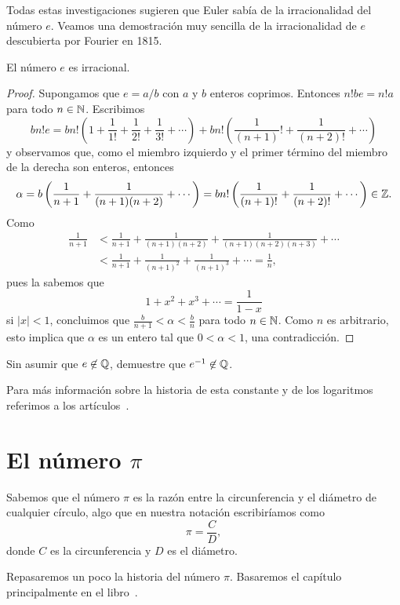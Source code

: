 Todas estas investigaciones sugieren que Euler sabía de la irracionalidad del
número $e$. Veamos una demostración muy sencilla de la irracionalidad de $e$
descubierta por Fourier en 1815. 

\begin{theorem}
	El número $e$ es irracional.	
\end{theorem}

\begin{proof}
	Supongamos que $e=a/b$ con $a$ y $b$ enteros coprimos. Entonces $n!be=n!a$
	para todo $n\in\mathbb{N}$. Escribimos
	\[
		bn!e=bn!\left(1+\frac{1}{1!}+\frac{1}{2!}+\frac{1}{3!}+\cdots\right)+bn!\left(\frac{1}{(n+1)}!+\frac{1}{(n+2)!}+\cdots\right)
	\]
	y observamos que, como el miembro izquierdo y el primer término del miembro
	de la derecha son enteros, entonces 
	\[
		\alpha=b\left(\frac{1}{n+1}+\frac{1}{(n+1)(n+2)}+\cdots\right)=bn!\left(\frac{1}{(n+1)!}+\frac{1}{(n+2)!}+\cdots\right)\in\mathbb{Z}.
	\]
	Como 
	\begin{align*}
		\frac{1}{n+1}&<\frac{1}{n+1}+\frac1{(n+1)(n+2)}+\frac{1}{(n+1)(n+2)(n+3)}+\cdots\\
		&<\frac{1}{n+1}+\frac{1}{(n+1)^2}+\frac{1}{(n+1)^3}+\cdots
		=\frac{1}{n},
	\end{align*}
	pues la sabemos que 
	\[
		1+x^2+x^3+\cdots=\frac{1}{1-x}
	\]
	si $|x|<1$, concluimos que 
	$\frac{b}{n+1}<\alpha<\frac{b}{n}$ para todo $n\in\mathbb{N}$. Como $n$ es
	arbitrario, esto implica que $\alpha$ es un entero tal que $0<\alpha<1$,
	una contradicción.
\end{proof}

\begin{exercise}
	Sin asumir que $e\not\in\mathbb{Q}$, 
	demuestre que $e^{-1}\not\in\mathbb{Q}$.
\end{exercise}

Para más información sobre la historia de esta constante y de los logaritmos
referimos a los 
artículos~\cite{MR1517859,MR1517841,MR1517806,MR1517796,MR1517770,MR1517761}.

\section*{El número $\pi$}

Sabemos que el número $\pi$ es la razón entre la circunferencia y el diámetro
de cualquier círculo, algo que en nuestra notación escribiríamos como
\[
	\pi=\frac{C}{D},
\]
donde $C$ es la circunferencia y $D$ es el diámetro. 

Repasaremos un poco la historia del número $\pi$. Basaremos el capítulo
principalmente en el libro~\cite{MR0449960}. 

